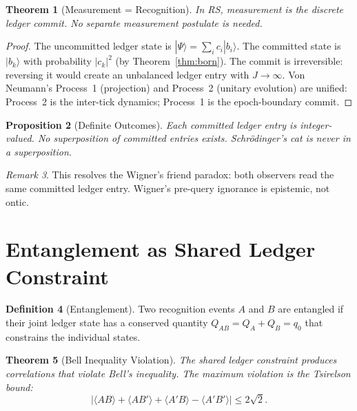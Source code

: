 \documentclass[12pt,a4paper]{article}
\newtheorem{theorem}{Theorem}[section]
\newtheorem{proposition}[theorem]{Proposition}
\theoremstyle{definition}
\newtheorem{definition}[theorem]{Definition}
\theoremstyle{remark}
\newtheorem{remark}[theorem]{Remark}
\begin{document}
\begin{theorem}[Measurement = Recognition]
\label{thm:measurement}
In RS, measurement is the discrete ledger commit.  No separate
measurement postulate is needed.
\end{theorem}

\begin{proof}
The uncommitted ledger state is
$|\Psi\rangle = \sum_i c_i |b_i\rangle$.  The committed state
is $|b_k\rangle$ with probability $|c_k|^2$ (by
Theorem~\ref{thm:born}).  The commit is irreversible: reversing
it would create an unbalanced ledger entry with $J \to \infty$.
Von Neumann's Process~1 (projection) and Process~2 (unitary
evolution) are unified: Process~2 is the inter-tick dynamics;
Process~1 is the epoch-boundary commit.
\end{proof}

\begin{proposition}[Definite Outcomes]
Each committed ledger entry is integer-valued.  No superposition
of committed entries exists.  Schr\"odinger's cat is never in a
superposition.
\end{proposition}

\begin{remark}
This resolves the Wigner's friend paradox: both observers read the
same committed ledger entry.  Wigner's pre-query ignorance is
epistemic, not ontic.
\end{remark}

\section{Entanglement as Shared Ledger Constraint}
\label{sec:entanglement}

\begin{definition}[Entanglement]
Two recognition events $A$ and $B$ are entangled if their joint
ledger state has a conserved quantity $Q_{AB} = Q_A + Q_B = q_0$
that constrains the individual states.
\end{definition}

\begin{theorem}[Bell Inequality Violation]
\label{thm:bell}
The shared ledger constraint produces correlations that violate
Bell's inequality.  The maximum violation is the Tsirelson bound:
\begin{equation}
  |\langle AB \rangle + \langle AB' \rangle +
  \langle A'B \rangle - \langle A'B' \rangle|
  \leq 2\sqrt{2}.
\end{equation}
\end{theorem}
\end{document}
